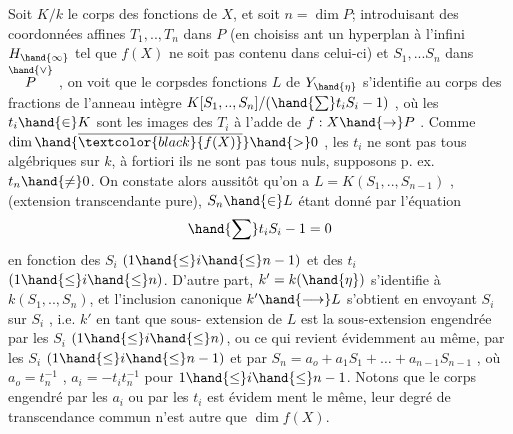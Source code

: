 
 Soit $K/k$ le corps des fonctions de $X$, et soit $n=\dim P$;
introduisant des coordonnées  affines $T_1,..,T_n$ dans $P$ (en choisiss
ant un hyperplan à l'infini $H_\hand{\infty}$ tel que $f(X)$ ne soit pas contenu dans
celui-ci) et $S_1,...S_n$ dans $\overset{\hand{\vee}}{P}$ , on voit que le corpsdes fonctions $L$
de $Y_{\hand{\eta}}$  s'identifie au corps des fractions de l'anneau intègre
$K[S_1,..,S_n]/(\hand{\sum} t_iS_i - 1)$ , où les $t_i \hand{\in} K$ sont les images des $T_i$ à
l'adde de $f:X\hand{\to} P$ . Comme $\dim \hand{\overline{\textcolor{black}{f(X)}}} \hand{>} 0$ , les $t_i$ ne sont pas tous
algébriques sur $k$, à fortiori ils ne sont pas tous nuls, supposons
p. ex. $t_n \hand{\neq} 0$. On constate alors aussitôt qu'on a $L = K(S_1,..,S_{n-1})$ ,
(extension transcendante pure), $S_n\hand{\in} L$ étant donné par l'équation
\[ \hand{\sum} t_iS_i - 1 = 0 \]
en fonction des $S_i$ $(1\hand{\leq} i\hand{\leq} n-1)$ et des $t_i$ $(1\hand{\leq} i\hand{\leq} n)$. D'autre part,
$k' = k(\hand{\eta})$ s'identifie à $k(S_1,..,S_n)$, et l'inclusion canonique
$k'\hand{\longrightarrow} L$ s'obtient en envoyant $S_i$ sur $S_i$ , i.e. $k'$ en tant que sous-%
extension de $L$ est la sous-extension engendrée par les $S_i$ $(1\hand{\leq} i\hand{\leq} n)$, ou
ce qui revient évidemment au même, par les $S_i$ $(1\hand{\leq} i\hand{\leq} n-1)$ et par
$S_n = a_o + a_1S_1 + \ldots + a_{n-1}S_{n-1}$ , où $a_o = t_n^{-1}$ , $a_i =-t_it_n^{-1}$ pour
$1\hand{\leq} i\hand{\leq} n-1$. Notons que le corps engendré par les $a_i$ ou par les $t_i$ est évidem
ment le même, leur degré de transcendance commun
n'est autre que $\dim f(X)$.

